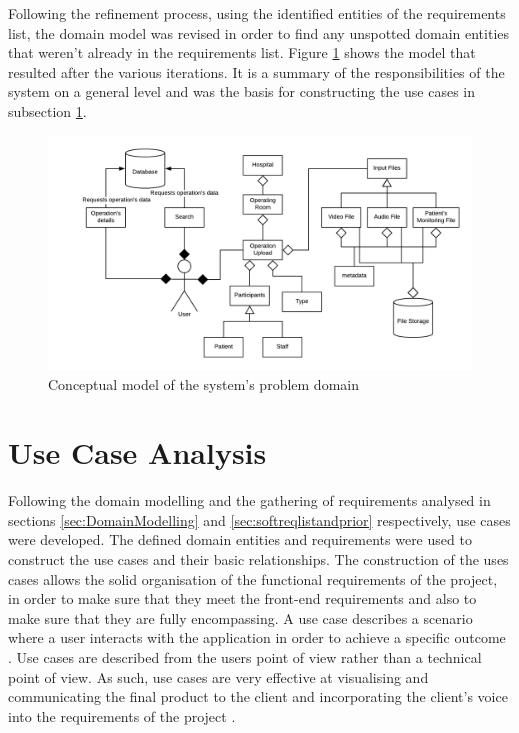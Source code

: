 Following the refinement process, using the identified entities of the requirements list, the domain model was revised in order to find any unspotted domain entities that weren't already in the requirements list. 
Figure \ref{domain_model} shows the model that resulted after the various iterations. It is a summary of the responsibilities of the system on a general level and was the basis for constructing the use cases in subsection \ref{sub:use_case_analysis}.

\begin{figure}[h]
\begin{center}
\includegraphics[width=17cm]{imgs/Domain_Model.png}
\end{center}\vspace{-0.3cm}
\caption[Domain Model]{Conceptual model of the system's problem domain} \label{domain_model}
\end{figure}



\section{Use Case Analysis}
\label{sub:use_case_analysis}

Following the domain modelling and the gathering of requirements analysed in sections \ref{sec:DomainModelling} and \ref{sec:softreqlistandprior} respectively, use cases were developed. The defined domain entities and requirements were used to construct the use cases and their basic relationships. The construction of the uses cases allows the solid organisation of the functional requirements of the project, in order to make sure that they meet the front-end requirements and also to make sure that they are fully encompassing. A use case describes a scenario where a user interacts with the application in order to achieve a specific outcome \cite{usecases3}. Use cases are described from the users point of view rather than a technical point of view. As such, use cases are very effective at visualising and communicating the final product to the client and incorporating the client's voice into the requirements of the project \cite{usecases2}.

